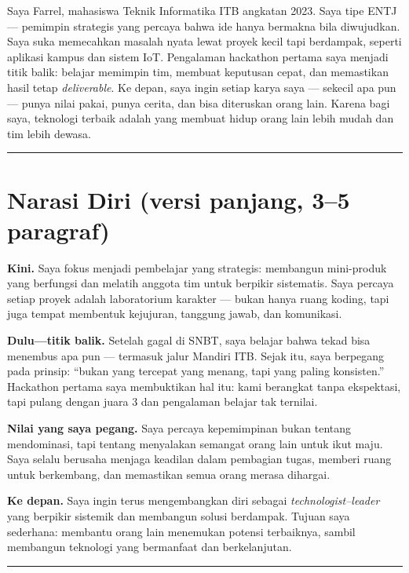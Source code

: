 \documentclass[
  letterpaper,
  DIV=11,
  numbers=noendperiod]{scrreprt}
\begin{document}
Saya Farrel, mahasiswa Teknik Informatika ITB angkatan 2023. Saya tipe
ENTJ --- pemimpin strategis yang percaya bahwa ide hanya bermakna bila
diwujudkan. Saya suka memecahkan masalah nyata lewat proyek kecil tapi
berdampak, seperti aplikasi kampus dan sistem IoT. Pengalaman hackathon
pertama saya menjadi titik balik: belajar memimpin tim, membuat
keputusan cepat, dan memastikan hasil tetap \emph{deliverable}. Ke
depan, saya ingin setiap karya saya --- sekecil apa pun --- punya nilai
pakai, punya cerita, dan bisa diteruskan orang lain. Karena bagi saya,
teknologi terbaik adalah yang membuat hidup orang lain lebih mudah dan
tim lebih dewasa.

\begin{center}\rule{0.5\linewidth}{0.5pt}\end{center}

\section{Narasi Diri (versi panjang, 3--5
paragraf)}\label{narasi-diri-versi-panjang-35-paragraf}

\textbf{Kini.} Saya fokus menjadi pembelajar yang strategis: membangun
mini-produk yang berfungsi dan melatih anggota tim untuk berpikir
sistematis. Saya percaya setiap proyek adalah laboratorium karakter ---
bukan hanya ruang koding, tapi juga tempat membentuk kejujuran, tanggung
jawab, dan komunikasi.

\textbf{Dulu---titik balik.} Setelah gagal di SNBT, saya belajar bahwa
tekad bisa menembus apa pun --- termasuk jalur Mandiri ITB. Sejak itu,
saya berpegang pada prinsip: ``bukan yang tercepat yang menang, tapi
yang paling konsisten.'' Hackathon pertama saya membuktikan hal itu:
kami berangkat tanpa ekspektasi, tapi pulang dengan juara 3 dan
pengalaman belajar tak ternilai.

\textbf{Nilai yang saya pegang.} Saya percaya kepemimpinan bukan tentang
mendominasi, tapi tentang menyalakan semangat orang lain untuk ikut
maju. Saya selalu berusaha menjaga keadilan dalam pembagian tugas,
memberi ruang untuk berkembang, dan memastikan semua orang merasa
dihargai.

\textbf{Ke depan.} Saya ingin terus mengembangkan diri sebagai
\emph{technologist--leader} yang berpikir sistemik dan membangun solusi
berdampak. Tujuan saya sederhana: membantu orang lain menemukan potensi
terbaiknya, sambil membangun teknologi yang bermanfaat dan
berkelanjutan.

\begin{center}\rule{0.5\linewidth}{0.5pt}\end{center}
\end{document}
